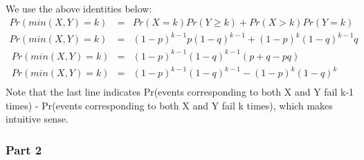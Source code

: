 \documentclass[10pt]{article}
\begin{document}
We use the above identities below:
\begin{eqnarray}
Pr(min(X, Y)=k)  &=& Pr(X=k)Pr(Y\geq k) + Pr(X>k)Pr(Y=k)\\
Pr(min(X, Y)=k)  &=& (1-p)^{k-1}p (1-q)^{k-1} + (1-p)^{k}(1-q)^{k-1}q\\\
Pr(min(X, Y)=k)  &=& (1-p)^{k-1}(1-q)^{k-1}(p+q-pq)\\\
Pr(min(X, Y)=k)  &=& (1-p)^{k-1}(1-q)^{k-1}-(1-p)^{k}(1-q)^{k}\\
\end{eqnarray}
Note that the last line indicates Pr(events corresponding to both X and Y fail k-1 times) - Pr(events corresponding to both X and Y fail k times), which makes intuitive sense.

\subsubsection*{Part 2}
\end{document}
